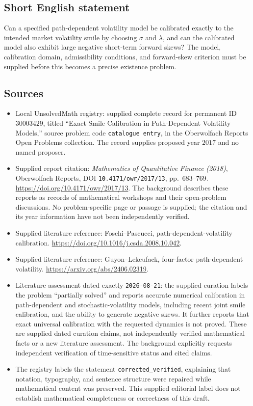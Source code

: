 \documentclass[11pt]{article}
\begin{document}
\subsection{Short English statement}
Can a specified path-dependent volatility model be calibrated exactly to the intended market volatility smile by choosing \(\sigma\) and \(\lambda\), and can the calibrated model also exhibit large negative short-term forward skews? The model, calibration domain, admissibility conditions, and forward-skew criterion must be supplied before this becomes a precise existence problem.
\subsection{Sources}
\begin{itemize}
\item Local UnsolvedMath registry: supplied complete record for permanent ID \(30003429\), titled ``Exact Smile Calibration in Path-Dependent Volatility Models,'' source problem code \texttt{catalogue entry}, in the Oberwolfach Reports Open Problems collection. The record supplies proposed year \(2017\) and no named proposer.
\item Supplied report citation: \emph{Mathematics of Quantitative Finance (2018)}, Oberwolfach Reports, DOI \texttt{10.4171/owr/2017/13}, pp.~683--769. \url{https://doi.org/10.4171/owr/2017/13}. The background describes these reports as records of mathematical workshops and their open-problem discussions. No problem-specific page or passage is supplied; the citation and its year information have not been independently verified.
\item Supplied literature reference: Foschi--Pascucci, path-dependent-volatility calibration. \url{https://doi.org/10.1016/j.csda.2008.10.042}.
\item Supplied literature reference: Guyon--Lekeufack, four-factor path-dependent volatility. \url{https://arxiv.org/abs/2406.02319}.
\item Literature assessment dated exactly \texttt{2026-08-21}: the supplied curation labels the problem ``partially solved'' and reports accurate numerical calibration in path-dependent and stochastic-volatility models, including recent joint smile calibration, and the ability to generate negative skews. It further reports that exact universal calibration with the requested dynamics is not proved. These are supplied dated curation claims, not independently verified mathematical facts or a new literature assessment. The background explicitly requests independent verification of time-sensitive status and cited claims.
\item The registry labels the statement \texttt{corrected\_verified}, explaining that notation, typography, and sentence structure were repaired while mathematical content was preserved. This supplied editorial label does not establish mathematical completeness or correctness of this draft.
\end{itemize}
\end{document}
